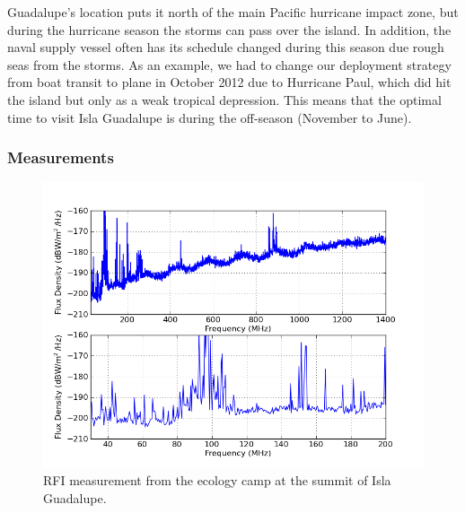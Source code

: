Guadalupe's location puts it north of the main Pacific hurricane impact zone, but during the hurricane season the storms can pass over the island. In addition, the naval supply vessel often has its schedule changed during this season due rough seas from the storms. As an example, we had to change our deployment strategy from boat transit to plane in October 2012 due to Hurricane Paul, which did hit the island but only as a weak tropical depression. This means that the optimal time to visit Isla Guadalupe is during the off-season (November to June). 

\subsubsection{Measurements}

\begin{figure}[htb]
\begin{center}
\includegraphics[width=0.95\linewidth]{RFI_testing/figures/GI_3__cal.png}
\caption{RFI measurement from the ecology camp at the summit of Isla Guadalupe.}
\label{Fig:guadsummit}
\end{center}
\end{figure}


